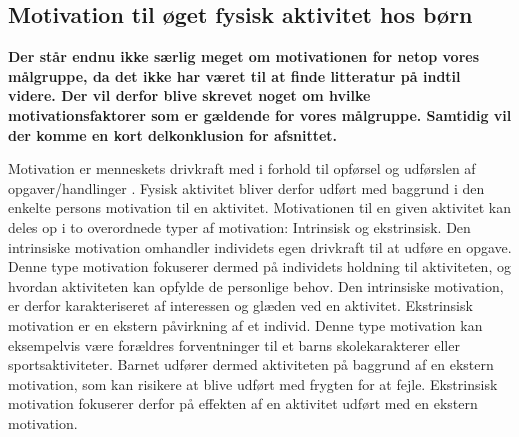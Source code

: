 \subsection{Motivation til øget fysisk aktivitet hos børn} \label{motivation_boern}
 {\color{red} \textbf{Der står endnu ikke særlig meget om motivationen for netop vores målgruppe, da det ikke har været til at finde litteratur på indtil videre. Der vil derfor blive skrevet noget om hvilke motivationsfaktorer som er gældende for vores målgruppe. Samtidig vil der komme en kort delkonklusion for afsnittet.}}


Motivation er menneskets drivkraft med i forhold til opførsel og udførslen af opgaver/handlinger \citep{V.Brown2007}. Fysisk aktivitet bliver derfor udført med baggrund i den enkelte persons motivation til en aktivitet. Motivationen til en given aktivitet kan deles op i to overordnede typer af motivation: Intrinsisk og ekstrinsisk. \newline
Den intrinsiske motivation omhandler individets egen drivkraft til at udføre en opgave. Denne type motivation fokuserer dermed på individets holdning til aktiviteten, og hvordan aktiviteten kan opfylde de personlige behov. Den intrinsiske motivation, er derfor karakteriseret af interessen og glæden ved en aktivitet. \newline
Ekstrinsisk motivation er en ekstern påvirkning af et individ. Denne type motivation kan eksempelvis være forældres forventninger til et barns skolekarakterer eller sportsaktiviteter. Barnet udfører dermed aktiviteten på baggrund af en ekstern motivation, som kan risikere at blive udført med frygten for at fejle. Ekstrinsisk motivation fokuserer derfor på effekten af en aktivitet udført med en ekstern motivation. \citep{J.SebireJagoR.FoxEtAl2013} 

